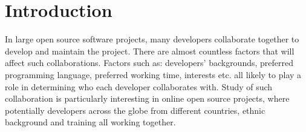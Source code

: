\documentclass{article}
\begin{document}

\section{Introduction}
In large open source software projects, many developers collaborate together to develop and maintain the project. There are almost countless factors that will affect such collaborations. Factors such as: developers' backgrounds, preferred programming language, preferred working time, interests etc. all likely to play a role in determining who each developer collaborates with. Study of such collaboration is particularly interesting in online open source projects, where potentially developers across the globe from different countries, ethnic background and training all working together.
\end{document}
